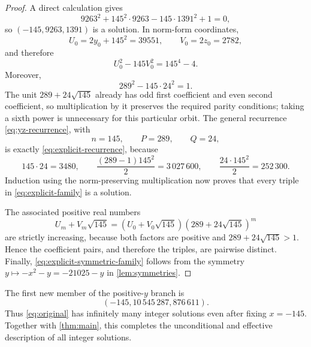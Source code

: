 \documentclass[a4paper,11pt]{amsart}
\theoremstyle{definition}
\theoremstyle{remark}
\begin{document}
\begin{proof}
A direct calculation gives
\[
9263^2+145^2\cdot9263-145\cdot1391^2+1=0,
\]
so $(-145,9263,1391)$ is a solution.  In norm-form coordinates,
\[
U_0=2y_0+145^2=39551,
\qquad V_0=2z_0=2782,
\]
and therefore
\[
U_0^2-145V_0^2=145^4-4.
\]
Moreover,
\[
289^2-145\cdot24^2=1.
\]
The unit $289+24\sqrt{145}$ already has odd first coefficient and even second coefficient, so multiplication by it preserves the required parity conditions; taking a sixth power is unnecessary for this particular orbit.  The general recurrence \eqref{eq:yz-recurrence}, with
\[
n=145,
\qquad P=289,
\qquad Q=24,
\]
is exactly \eqref{eq:explicit-recurrence}, because
\[
145\cdot24=3480,
\qquad
\frac{(289-1)145^2}{2}=3\,027\,600,
\qquad
\frac{24\cdot145^2}{2}=252\,300.
\]
Induction using the norm-preserving multiplication now proves that every triple in \eqref{eq:explicit-family} is a solution.

The associated positive real numbers
\[
U_m+V_m\sqrt{145}
 =(U_0+V_0\sqrt{145})(289+24\sqrt{145})^m
\]
are strictly increasing, because both factors are positive and $289+24\sqrt{145}>1$.  Hence the coefficient pairs, and therefore the triples, are pairwise distinct.  Finally, \eqref{eq:explicit-symmetric-family} follows from the symmetry $y\mapsto-x^2-y=-21025-y$ in \cref{lem:symmetries}.
\end{proof}

The first new member of the positive-$y$ branch is
\[
(-145,10\,545\,287,876\,611).
\]
Thus \eqref{eq:original} has infinitely many integer solutions even after fixing $x=-145$.  Together with \cref{thm:main}, this completes the unconditional and effective description of all integer solutions.
\end{document}
